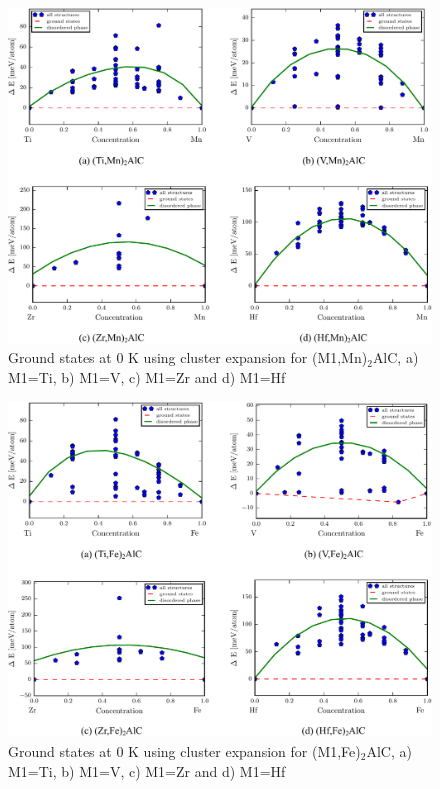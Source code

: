 \documentclass[preprint,amsmath,amssymb,aps, prb,showkeys]{revtex4-1}
\begin{document}
\begin{figure}
\centering
\includegraphics[scale=0.5]{figure_22.pdf}   
\caption{Ground states at 0 K using cluster expansion for (M1,Mn)$_2$AlC, a) M1=Ti, b) M1=V, c) M1=Zr and d) M1=Hf }
\end{figure}

\begin{figure}
\centering
\includegraphics[scale=0.5]{figure_23.pdf}   
\caption{Ground states at 0 K using cluster expansion for (M1,Fe)$_2$AlC, a) M1=Ti, b) M1=V, c) M1=Zr and d) M1=Hf }
\end{figure}
\end{document}
